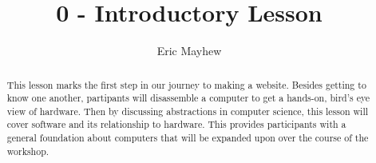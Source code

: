 \documentclass[11pt]{article}
\title{0 - Introductory Lesson}
\author{Eric Mayhew}
\date{}
\begin{document}
\renewcommand{\abstractname}{\vspace{-\baselineskip}}
\maketitle
\begin{abstract}
This lesson marks the first step in our journey to making a website. Besides
  getting to know one another,
  partipants will disassemble a computer to get a hands-on, bird's eye view of
  hardware. Then by discussing abstractions in computer science, this lesson
  will cover software
  and its relationship to hardware. This provides participants with a general
  foundation about computers that will be expanded upon over the course
  of the workshop.
\end{abstract}
\end{document}
